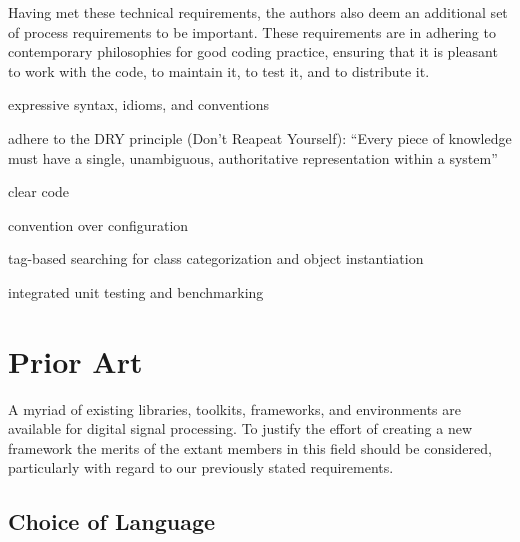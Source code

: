 \documentclass[twoside,10pt]{article}
\newenvironment{packed_item}{
\begin{itemize}
  \setlength{\itemsep}{1pt}
  \setlength{\parskip}{0pt}
  \setlength{\parsep}{0pt}
}{\end{itemize}}
\begin{document}
Having met these technical requirements, the authors also deem an additional set of process requirements to be important.  These requirements are in adhering to contemporary philosophies for good coding practice, ensuring that it is pleasant to work with the code, to maintain it, to test it, and to distribute it.

\begin{packed_item}%
	\item expressive syntax, idioms, and conventions
	\item adhere to the DRY principle (Don't Reapeat Yourself): ``Every piece of knowledge must have a single, unambiguous, authoritative representation within a system''\cite{Hunt:1999}
	\item clear code %
	\item convention over configuration
	\item tag-based searching for class categorization and object instantiation
	\item integrated unit testing and benchmarking %
\end{packed_item}%






\section{Prior Art} %

A myriad of existing libraries, toolkits, frameworks, and environments are available for digital signal processing.  To justify the effort of creating a new framework the merits of the extant members in this field should be considered, particularly with regard to our previously stated requirements.


\subsection{Choice of Language} %
\end{document}
